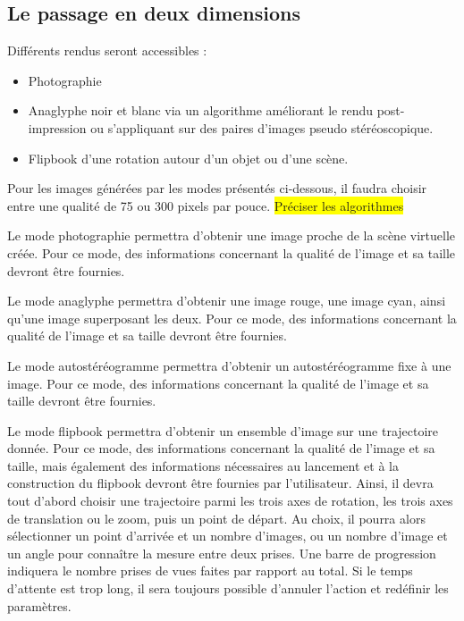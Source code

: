\subsection{Le passage en deux dimensions}
\begin{description}[style=nextline]
	\item[Mode de passage en deux dimensions]
	Différents rendus seront accessibles : 
	\begin{itemize}
			\item Photographie
			\item Anaglyphe noir et blanc via un algorithme améliorant le rendu post-impression ou s’appliquant sur des paires d’images pseudo stéréoscopique.
                        \item Flipbook d'une rotation autour d'un objet ou d'une scène.
	\end{itemize}
	Pour les images générées par les modes présentés ci-dessous, il faudra choisir entre une qualité de 75 ou 300 pixels par pouce. \colorbox{yellow}{Préciser les algorithmes} 
	
	\item[Mode photographie]
	\mbox{\hspace{1cm}} Le mode photographie permettra d’obtenir une image proche de la scène virtuelle créée. Pour ce mode, des informations concernant la qualité de l’image et sa taille devront être fournies.
	
	\item[Mode analgyphe]	
	\mbox{\hspace{1cm}}Le mode anaglyphe permettra d’obtenir une image rouge, une image cyan, ainsi qu’une image superposant les deux. Pour ce mode, des informations concernant la qualité de l’image et sa taille devront être fournies.
	
	\item[Mode autostéréogramme]	
	\mbox{\hspace{1cm}}Le mode autostéréogramme permettra d’obtenir un autostéréogramme fixe à une image. Pour ce mode, des informations concernant la qualité de l’image et sa taille devront être fournies.
	
	\item[Mode flipbook]	
	\mbox{\hspace{1cm}}Le mode flipbook permettra d’obtenir un ensemble d’image sur une trajectoire donnée. Pour ce mode, des informations concernant la qualité de l’image et sa taille, mais également des informations nécessaires au lancement et à la construction du flipbook devront être fournies par l’utilisateur. Ainsi, il devra tout d’abord choisir une trajectoire parmi les trois axes de rotation, les trois axes de translation ou le zoom, puis un point de départ. Au choix, il pourra alors sélectionner un point d’arrivée et un nombre d’images, ou un nombre d’image et un angle pour connaître la mesure entre deux prises. Une barre de progression indiquera le nombre prises de vues faites par rapport au total. Si le temps d’attente est trop long, il sera toujours possible d’annuler l’action et redéfinir les paramètres.
	

\end{description}
